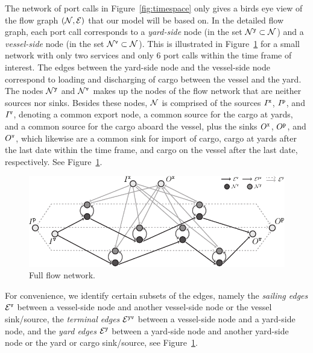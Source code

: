 The network of port calls in Figure~\ref{fig:timespace} only gives a birds eye view of the flow graph $(\mathcal{N},\mathcal{E})$ that our model will be based on. In the detailed flow graph, each port call corresponds to a \emph{yard-side} node (in the set $\mathcal{N}^\texttt{y}\subset \mathcal{N}$) and a \emph{vessel-side} node (in the set $\mathcal{N}^\texttt{v}\subset\mathcal{N}$). This is illustrated in Figure~\ref{fig:flow} for a small network with only two services and only 6 port calls within the time frame of interest. The edges between the yard-side node and the vessel-side node correspond to loading and discharging of cargo between the vessel and the yard. The nodes $\mathcal{N}^\texttt{y}$ and $\mathcal{N}^\texttt{v}$ makes up the nodes of the flow network that are neither sources nor sinks. %
Besides these nodes, $\mathcal{N}$ is comprised of the sources $I^\texttt{x}$, $I^\texttt{p}$, and $I^\texttt{v}$, denoting a common export node, a common source for the cargo at yards, and a common source for the cargo aboard the vessel, plus the sinks $O^\texttt{x}$, $O^\texttt{p}$, and $O^\texttt{v}$, which likewise are a common sink for import of cargo, cargo at yards after the last date within the time frame, and cargo on the vessel after the last date, respectively. See Figure~\ref{fig:flow}.

\begin{figure}
	\centering
		\includegraphics[scale = 1]{figures/fullFlow.pdf}
		\caption{Full flow network.}  \label{fig:flow}
\end{figure}

For convenience, we identify certain subsets of the edges, namely the \emph{sailing edges} $\mathcal{E}^\texttt{v}$ between a vessel-side node and another vessel-side node or the vessel sink/source, 
the \emph{terminal edges} $\mathcal{E}^\texttt{yv}$ between a vessel-side node and a yard-side node, 
and the \emph{yard edges} $\mathcal{E}^{\texttt{y}}$ between a yard-side node and another yard-side node or the yard or cargo sink/source, 
see Figure~\ref{fig:flow}.

